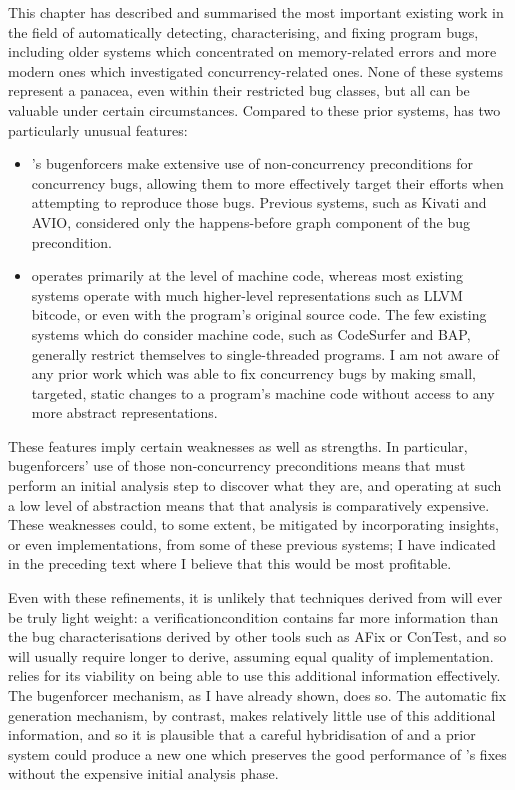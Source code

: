 This chapter has described and summarised the most important existing
work in the field of automatically detecting, characterising, and
fixing program bugs, including older systems which concentrated on
memory-related errors and more modern ones which investigated
concurrency-related ones.  None of these systems represent a panacea,
even within their restricted bug classes, but all can be valuable
under certain circumstances.  Compared to these prior systems,
{\technique} has two particularly unusual features:
\begin{itemize}
\item {\Technique}'s \glspl{bugenforcer} make extensive use of
  non-concurrency preconditions for concurrency bugs, allowing them to
  more effectively target their efforts when attempting to reproduce
  those bugs.  Previous systems, such as Kivati and AVIO, considered
  only the happens-before graph component of the bug precondition.
\item {\Technique} operates primarily at the level of machine code,
  whereas most existing systems operate with much higher-level
  representations such as LLVM bitcode, or even with the program's
  original source code.  The few existing systems which do consider
  machine code, such as CodeSurfer and BAP, generally restrict
  themselves to single-threaded programs.  I am not aware of any prior
  work which was able to fix concurrency bugs by making small,
  targeted, static changes to a program's machine code without access
  to any more abstract representations.
\end{itemize}
These features imply certain weaknesses as well as strengths.  In
particular, \glspl{bugenforcer}' use of those non-concurrency
preconditions means that {\technique} must perform an initial analysis
step to discover what they are, and operating at such a low level of
abstraction means that that analysis is comparatively expensive.
These weaknesses could, to some extent, be mitigated by incorporating
insights, or even implementations, from some of these previous
systems; I have indicated in the preceding text where I believe that
this would be most profitable.

Even with these refinements, it is unlikely that techniques derived
from {\technique} will ever be truly light weight: a {\technique}
\gls{verificationcondition} contains far more information than the bug
characterisations derived by other tools such as AFix or ConTest, and
so will usually require longer to derive, assuming equal quality of
implementation.  {\Technique} relies for its viability on being able
to use this additional information effectively.  The \gls{bugenforcer}
mechanism, as I have already shown, does so.  The automatic fix
generation mechanism, by contrast, makes relatively little use of this
additional information, and so it is plausible that a careful
hybridisation of {\technique} and a prior system could produce a new
one which preserves the good performance of {\technique}'s fixes
without the expensive initial analysis phase.


